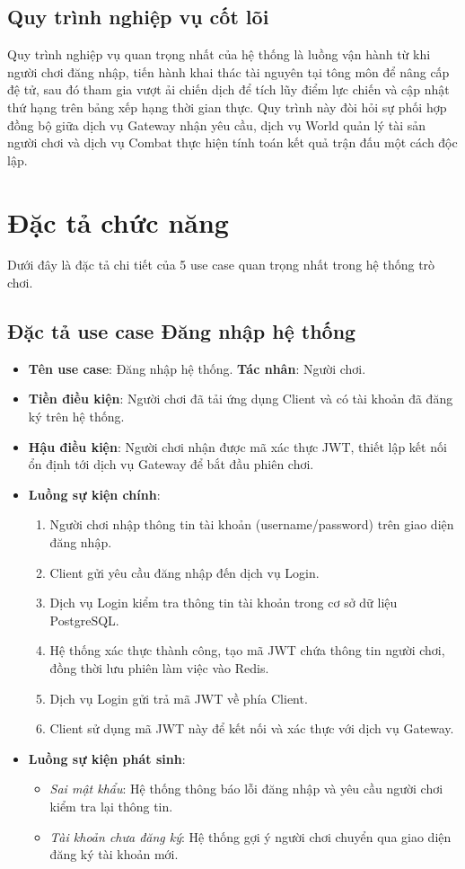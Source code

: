 \documentclass[../Project.tex]{subfiles}
\begin{document}
\subsection{Quy trình nghiệp vụ cốt lõi}
Quy trình nghiệp vụ quan trọng nhất của hệ thống là luồng vận hành từ khi người chơi đăng nhập, tiến hành khai thác tài nguyên tại tông môn để nâng cấp đệ tử, sau đó tham gia vượt ải chiến dịch để tích lũy điểm lực chiến và cập nhật thứ hạng trên bảng xếp hạng thời gian thực. Quy trình này đòi hỏi sự phối hợp đồng bộ giữa dịch vụ Gateway nhận yêu cầu, dịch vụ World quản lý tài sản người chơi và dịch vụ Combat thực hiện tính toán kết quả trận đấu một cách độc lập.

\section{Đặc tả chức năng}
Dưới đây là đặc tả chi tiết của 5 use case quan trọng nhất trong hệ thống trò chơi.

\subsection{Đặc tả use case Đăng nhập hệ thống}
\begin{itemize}
    \item \textbf{Tên use case}: Đăng nhập hệ thống.
    \textbf{Tác nhân}: Người chơi.
    \item \textbf{Tiền điều kiện}: Người chơi đã tải ứng dụng Client và có tài khoản đã đăng ký trên hệ thống.
    \item \textbf{Hậu điều kiện}: Người chơi nhận được mã xác thực JWT, thiết lập kết nối ổn định tới dịch vụ Gateway để bắt đầu phiên chơi.
    \item \textbf{Luồng sự kiện chính}:
    \begin{enumerate}
        \item Người chơi nhập thông tin tài khoản (username/password) trên giao diện đăng nhập.
        \item Client gửi yêu cầu đăng nhập đến dịch vụ Login.
        \item Dịch vụ Login kiểm tra thông tin tài khoản trong cơ sở dữ liệu PostgreSQL.
        \item Hệ thống xác thực thành công, tạo mã JWT chứa thông tin người chơi, đồng thời lưu phiên làm việc vào Redis.
        \item Dịch vụ Login gửi trả mã JWT về phía Client.
        \item Client sử dụng mã JWT này để kết nối và xác thực với dịch vụ Gateway.
    \end{enumerate}
    \item \textbf{Luồng sự kiện phát sinh}:
    \begin{itemize}
        \item \textit{Sai mật khẩu}: Hệ thống thông báo lỗi đăng nhập và yêu cầu người chơi kiểm tra lại thông tin.
        \item \textit{Tài khoản chưa đăng ký}: Hệ thống gợi ý người chơi chuyển qua giao diện đăng ký tài khoản mới.
    \end{itemize}
\end{itemize}
\end{document}
